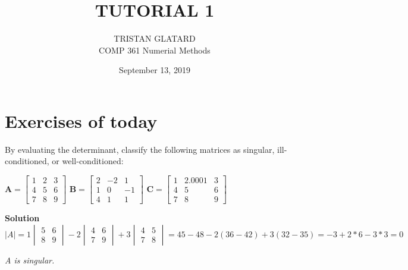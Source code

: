 \documentclass[12pt]{article}
\newenvironment{exercise}[2][Exercise]{\begin{trivlist}
\item[\hskip \labelsep {\bfseries #1}\hskip \labelsep {\bfseries #2.}]}{\end{trivlist}}
\begin{document}
\title{TUTORIAL 1}%
\author{TRISTAN GLATARD\\ %
COMP 361 Numerial Methods} %
\date{September 13, 2019}
\maketitle

\section{Exercises of today}

\begin{exercise}{1} %
By evaluating the determinant, classify the following matrices as singular, ill-conditioned, or well-conditioned:\\
\begin{center}

$\textbf{A}=
\begin{bmatrix}
1&2&3 \\4&5&6 \\ 7&8&9
\end{bmatrix}$
$\textbf{B}=
\begin{bmatrix}
2&-2&1 \\1&0&-1 \\ 4&1&1
\end{bmatrix}$
$\textbf{C}=
\begin{bmatrix}
1&2.0001&3 \\4&5&6 \\ 7&8&9
\end{bmatrix}$
\end{center}
\textbf{Solution}\\

$
\vert A \vert = 1
\begin{vmatrix}
5&6 \\ 8&9
\end{vmatrix} - 2
\begin{vmatrix}
4&6 \\ 7&9
\end{vmatrix} + 3
\begin{vmatrix}
4&5 \\ 7&8
\end{vmatrix} = 45 - 48 - 2 (36-42) + 3 (32 - 35) = -3 + 2*6 - 3*3 = 0
$

\textit{A is singular.} \\


\end{exercise}
\end{document}
